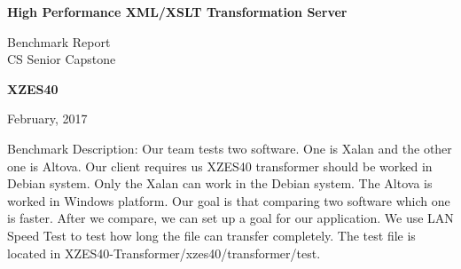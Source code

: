 \documentclass[letterpaper,10pt,titlepage]{article}
\begin{document}
\begin{titlepage}
    \begin{center}
        \vspace*{1cm}
        \Huge
        \textbf{High Performance XML/XSLT Transformation Server}
        \vspace{0.5cm}
        
        \LARGE
        Benchmark Report \\
        \vspace{1cm}
        CS Senior Capstone \\
        \vspace{1.5cm}

        \textbf{XZES40}
        \date{February, 2017}
        \vfill
        February, 2017
    \end{center}
\end{titlepage}

Benchmark Description:
Our team tests two software. One is Xalan and the other one is Altova. Our client
requires us XZES40 transformer should be worked in Debian system. Only the Xalan
can work in the Debian system. The Altova is worked in Windows platform. Our goal
is that comparing two software which one is faster. After we compare, we can set up a
goal for our application. We use LAN Speed Test to test how long the file can transfer
completely. The test file is located in XZES40-Transformer/xzes40/transformer/test.
\end{document}
